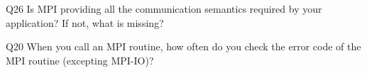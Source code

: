 \begin{description}%
\item{Q26} Is MPI providing all the communication semantics required by your application? If not, what is missing?%
\item{Q20} When you call an MPI routine, how often do you check the error code of the MPI routine  (excepting MPI-IO)?%
\end{description}%
